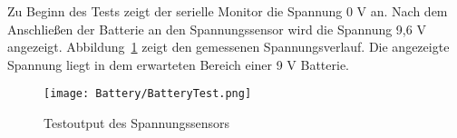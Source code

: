 Zu Beginn des Tests zeigt der serielle Monitor die Spannung 0 V an. Nach dem Anschließen der Batterie an den Spannungssensor wird die Spannung 9,6 V angezeigt.  Abbildung~\ref{BildSpannungTest} zeigt den gemessenen Spannungsverlauf. Die angezeigte Spannung liegt in dem erwarteten Bereich einer 9 V Batterie.

\begin{figure}[h]
    \begin{center}
        \texttt{[image: Battery/BatteryTest.png]}
        \caption{Testoutput des Spannungssensors}
        \label{BildSpannungTest}
    \end{center}
\end{figure}

